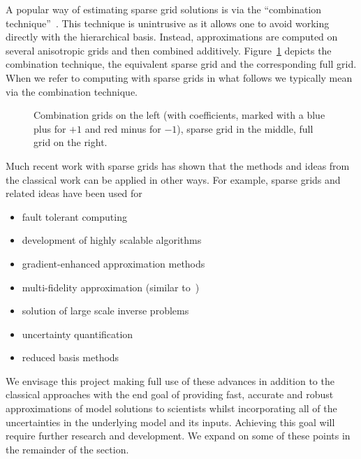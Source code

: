 \documentclass[a4paper,fontsize=12pt]{scrartcl}
\begin{document}
A popular way of estimating sparse grid solutions is via the
``combination technique''~\parencite{Griebel1990}. This technique is
unintrusive as it allows one to avoid working directly with the
hierarchical basis. Instead, approximations are computed on several
anisotropic grids and then combined additively.
Figure~\ref{fig:sparse_grids} depicts the combination technique, the
equivalent sparse grid and the corresponding full grid. When we refer
to computing with sparse grids in what follows we typically mean via
the combination technique.

\begin{figure}
  \centering
    
  \caption{Combination grids on the left (with coefficients, marked with
    a blue plus for $+1$ and red minus for $-1$), sparse grid in the
    middle, full grid on the right.}
  \label{fig:sparse_grids}
\end{figure}


Much recent work with sparse grids has shown that the methods and ideas
from the classical work can be applied in other ways.
For example, sparse grids and related ideas have been used for
\begin{itemize}
\item fault tolerant computing~\parencite{HardingHLS2015,AliEtal2015}
\item development of highly scalable algorithms~\parencite{StrazdinsEtal2015}
\item gradient-enhanced approximation methods~\parencite{deBaarHarding2015,Jakeman2015}
\item multi-fidelity approximation (similar to~\parencite{deBaarRDM2015}) 
\item solution of large scale inverse problems~\parencite{Zabaras2010}
\item uncertainty quantification~\parencite{JakemanRoberts2013,FranzelinDiehlPfluger2014}
\item reduced basis methods~\parencite{Peherstorfer2013,ChenSchwab2015}
\end{itemize}
We envisage this project making full use of these advances in addition 
to the classical approaches with the end goal of providing fast, accurate
and robust approximations of model solutions to scientists whilst 
incorporating all of the uncertainties in the underlying model and its inputs. 
Achieving this goal will require further research and development.
We expand on some of these points in the remainder of the section.
\end{document}
